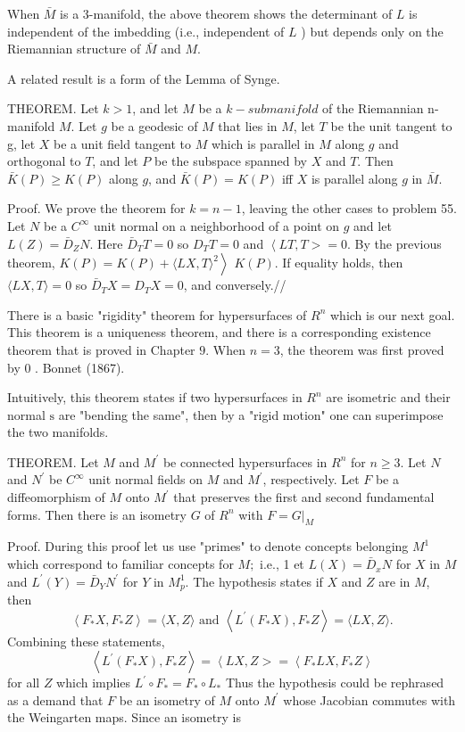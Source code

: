 \documentclass[10pt]{article}
\begin{document}
When $\bar{M}$ is a 3-manifold, the above theorem shows the determinant of $L$ is independent of the imbedding (i.e., independent of $L$ ) but depends only on the Riemannian structure of $\bar{M}$ and $M$.

A related result is a form of the Lemma of Synge.

THEOREM. Let $k>1$, and let $M$ be a $k-s u b m a n i f o l d$ of the Riemannian n-manifold $M$. Let $g$ be a geodesic of $M$ that lies in $M$, let $T$ be the unit tangent to g, let $X$ be a unit field tangent to $M$ which is parallel in $M$ along $g$ and orthogonal to $T$, and let $P$ be the subspace spanned by $X$ and $T$. Then $\bar{K}(P) \geq K(P)$ along $g$, and $\bar{K}(P)=K(P)$ iff $X$ is parallel along $g$ in $\bar{M}$.

Proof. We prove the theorem for $k=n-1$, leaving the other cases to problem 55. Let $N$ be a $C^{\infty}$ unit normal on a neighborhood of a point on $g$ and let $L(Z)=\bar{D}_{Z} N$. Here $\bar{D}_{T} T=0$ so $D_{T} T=0$ and $\left\langle L T, T>=0\right.$. By the previous theorem, $\left.K(P)=K(P)+\langle L X, T\rangle^{2}\right\rangle$ $K(P)$. If equality holds, then $\langle L X, T\rangle=0$ so $\bar{D}_{T} X=D_{T} X=0$, and conversely.//

There is a basic "rigidity" theorem for hypersurfaces of $R^{n}$ which is our next goal. This theorem is a uniqueness theorem, and there is a corresponding existence theorem that is proved in Chapter $9 .$ When $n=3$, the theorem was first proved by 0 . Bonnet (1867).

Intuitively, this theorem states if two hypersurfaces in $R^{n}$ are isometric and their normal $\mathrm{s}$ are "bending the same", then by a "rigid motion" one can superimpose the two manifolds.

THEOREM. Let $M$ and $M^{\prime}$ be connected hypersurfaces in $R^{n}$ for $n \geq 3$. Let $N$ and $N^{\prime}$ be $C^{\infty}$ unit normal fields on $M$ and $M^{\prime}$, respectively. Let $F$ be a diffeomorphism of $M$ onto $M^{\prime}$ that preserves the first and second fundamental forms. Then there is an isometry $G$ of $R^{n}$ with $F=\left.G\right|_{M}$

Proof. During this proof let us use "primes" to denote concepts belonging $M^{1}$ which correspond to familiar concepts for $M ;$ i.e., 1 et $L(X)=\bar{D}_{x} N$ for $X$ in $M$ and $L^{\prime}(Y)=\bar{D}_{Y} N^{\prime}$ for $Y$ in $M_{p}^{1}$. The hypothesis states if $X$ and $Z$ are in $M$, then
$$
\left\langle F_{*} X, F_{*} Z\right\rangle=\langle X, Z\rangle \text { and }\left\langle L^{\prime}\left(F_{*} X\right), F_{*} Z\right\rangle=\langle L X, Z\rangle .
$$
Combining these statements,
$$
\left\langle L^{\prime}\left(F_{*} X\right), F_{*} Z\right\rangle=\left\langle L X, Z>=\left\langle F_{*} L X, F_{*} Z\right\rangle\right.
$$
for all $Z$ which implies $L^{\prime} \circ F_{*}=F_{*} \circ L_{*}$ Thus the hypothesis could be rephrased as a demand that $F$ be an isometry of $M$ onto $M^{\prime}$ whose Jacobian commutes with the Weingarten maps. Since an isometry is
\end{document}
